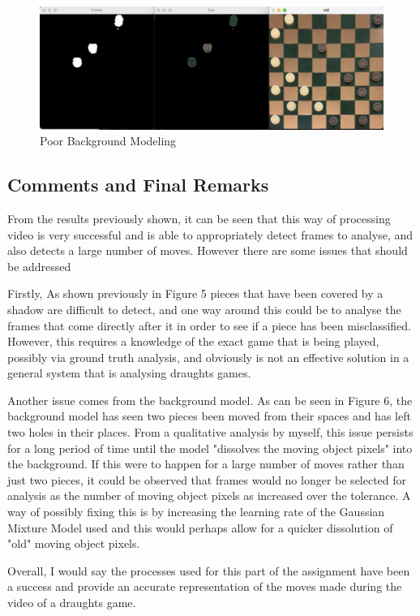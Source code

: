 \documentclass[12pt]{article}
\begin{document}
    \newpage

    \begin{figure}
        \centering
        \includegraphics[scale=0.3]{Poor-Detection.png}
        \caption{Poor Background Modeling}
    \end{figure}

    \subsection{Comments and Final Remarks}
    \par
    From the results previously shown, it can be seen that this way of processing video is very successful and is able to appropriately detect frames to analyse, and also detects a large number of moves. However there are some 
    issues that should be addressed
    \par
    Firstly, As shown previously in Figure 5 pieces that have been covered by a shadow are difficult to detect, and one way around this could be to analyse the frames that come directly after it in order to see if a piece has been
    misclassified. However, this requires a knowledge of the exact game that is being played, possibly via ground truth analysis, and obviously is not an effective solution in a general system that is analysing draughts games.
    \par
    Another issue comes from the background model. As can be seen in Figure 6, the background model has seen two pieces been moved from their spaces and has left two holes in their places. From a qualitative analysis by myself, this 
    issue persists for a long period of time until the model "dissolves the moving object pixels" into the background. If this were to happen for a large number of moves rather than just two pieces, it could be observed that frames 
    would no longer be selected for analysis as the number of moving object pixels as increased over the tolerance. A way of possibly fixing this is by increasing the learning rate of the Gaussian Mixture Model used and this would perhaps 
    allow for a quicker dissolution of "old" moving object pixels.
    \par
    Overall, I would say the processes used for this part of the assignment have been a success and provide an accurate representation of the moves made during the video of a draughts game.
\end{document}
